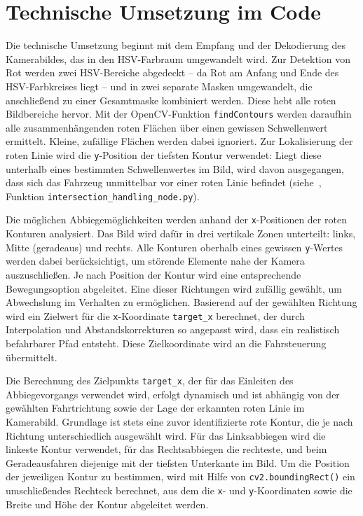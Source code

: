 \section{Technische Umsetzung im Code}
Die technische Umsetzung beginnt mit dem Empfang und der Dekodierung des Kamerabildes, das in den \ac{HSV}-Farbraum 
umgewandelt wird. Zur Detektion von Rot werden zwei \ac{HSV}-Bereiche abgedeckt – da Rot am Anfang und Ende des 
\ac{HSV}-Farbkreises liegt – und in zwei separate Masken umgewandelt, die anschließend zu einer Gesamtmaske kombiniert 
werden. Diese hebt alle roten Bildbereiche hervor. Mit der OpenCV-Funktion \texttt{findContours} werden daraufhin alle 
zusammenhängenden roten Flächen über einen gewissen Schwellenwert ermittelt. Kleine, zufällige Flächen werden dabei ignoriert. Zur Lokalisierung der 
roten Linie wird die \texttt{y}-Position der tiefsten Kontur verwendet: Liegt diese unterhalb eines bestimmten 
Schwellenwertes im Bild, wird davon ausgegangen, dass sich das Fahrzeug unmittelbar vor einer roten Linie befindet (siehe~\cite{QuackSquad}, Funktion \texttt{intersection\_handling\_node.py}).

Die möglichen Abbiegemöglichkeiten werden anhand der \texttt{x}-Positionen der roten Konturen analysiert. Das Bild wird 
dafür in drei vertikale Zonen unterteilt: links, Mitte (geradeaus) und rechts. Alle Konturen oberhalb eines 
gewissen \texttt{y}-Wertes werden dabei berücksichtigt, um störende Elemente nahe der Kamera auszuschließen. Je nach 
Position der Kontur wird eine entsprechende Bewegungsoption abgeleitet. Eine dieser Richtungen wird zufällig 
gewählt, um Abwechslung im Verhalten zu ermöglichen. Basierend auf der gewählten Richtung wird ein Zielwert für 
die \texttt{x}-Koordinate \texttt{target\_x} berechnet, der durch Interpolation und Abstandskorrekturen so angepasst wird, dass 
ein realistisch befahrbarer Pfad entsteht. Diese Zielkoordinate wird an die Fahrsteuerung übermittelt.

Die Berechnung des Zielpunkts \texttt{target\_x}, der für das Einleiten des Abbiegevorgangs verwendet wird, erfolgt 
dynamisch und ist abhängig von der gewählten Fahrtrichtung sowie der Lage der erkannten roten Linie im Kamerabild. 
Grundlage ist stets eine zuvor identifizierte rote Kontur, die je nach Richtung unterschiedlich ausgewählt wird.
Für das Linksabbiegen wird die linkeste Kontur verwendet, für das Rechtsabbiegen die rechteste, und beim 
Geradeausfahren diejenige mit der tiefsten Unterkante im Bild. Um die Position der jeweiligen Kontur zu bestimmen, 
wird mit Hilfe von \texttt{cv2.boundingRect()} ein umschließendes Rechteck berechnet, aus dem die \texttt{x}- und \texttt{y}-Koordinaten 
sowie die Breite und Höhe der Kontur abgeleitet werden.

